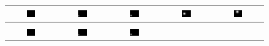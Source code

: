 \documentclass[acmsmall,review,anonymous]{acmart}\settopmatter{printfolios=true,printccs=false,printacmref=false}
\begin{document}
\begin{figure}
\setlength\tabcolsep{0.1em}
\begin{tabular}{ccccc}
\includegraphics[width=0.19\textwidth]{images/true-field-t=50} &
\includegraphics[width=0.19\textwidth]{images/true-field-t=641} &
\includegraphics[width=0.19\textwidth]{images/true-field-t=1232} &
\includegraphics[width=0.19\textwidth]{images/true-field-t=3006} &
\includegraphics[width=0.19\textwidth]{images/true-field-t=4089} \\
\hline \\
\includegraphics[width=0.19\textwidth]{images/field-t=50} & 
\includegraphics[width=0.19\textwidth]{images/field-t=641} &
\includegraphics[width=0.19\textwidth]{images/field-t=1232} & 

\end{tabular}
\end{figure}
\end{document}
